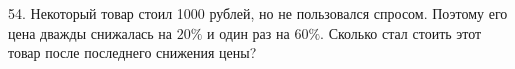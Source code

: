54. Некоторый товар стоил 1000 рублей, но не пользовался спросом. Поэтому его цена дважды снижалась на $20\%$ и один раз на $60\%.$ Сколько стал стоить этот товар после последнего снижения цены?\\
